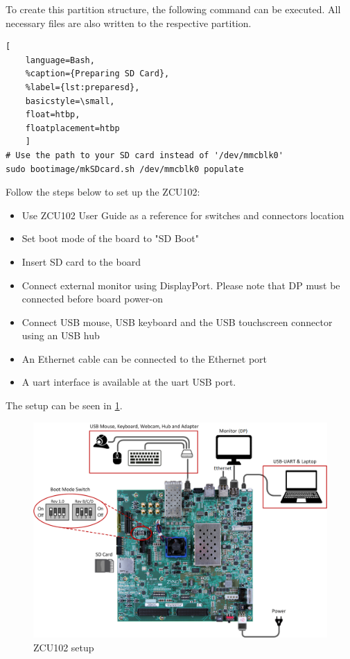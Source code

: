 To create this partition structure, the following command can be executed. All necessary files are also written to the respective partition.
\begin{lstlisting}[
	language=Bash,
	%caption={Preparing SD Card},
	%label={lst:preparesd},
	basicstyle=\small,
	float=htbp,
	floatplacement=htbp
	]
# Use the path to your SD card instead of '/dev/mmcblk0'
sudo bootimage/mkSDcard.sh /dev/mmcblk0 populate
\end{lstlisting}
\FloatBarrier

Follow the steps below to set up the ZCU102:
\begin{itemize}
    \item Use ZCU102 User Guide \cite{UG1182} as a reference for switches and connectors location
    \item Set boot mode of the board to "SD Boot"
    \item Insert SD card to the board
    \item Connect external monitor using DisplayPort. Please note that DP must be connected before board power-on
    \item Connect USB mouse, USB keyboard and the USB touchscreen connector using an USB hub
    \item An Ethernet cable can be connected to the Ethernet port
    \item A \gls{uart} interface is available at the \gls{uart} USB port.
\end{itemize}

The setup can be seen in \cref{fig:zcu102setup}.

\begin{figure}[htbp]
    \centering
    \includegraphics[width=1\textwidth]{images/ZCU102.png}
    \caption{\label{fig:zcu102setup} ZCU102 setup}
\end{figure}

